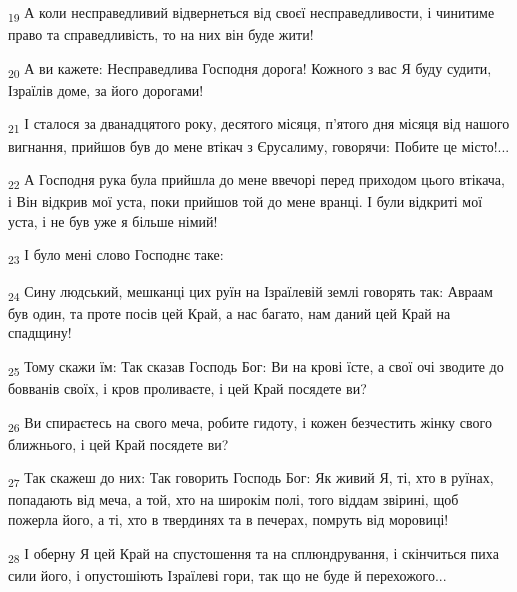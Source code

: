 \begin{tcolorbox}
\textsubscript{19} А коли несправедливий відвернеться від своєї несправедливости, і чинитиме право та справедливість, то на них він буде жити!
\end{tcolorbox}
\begin{tcolorbox}
\textsubscript{20} А ви кажете: Несправедлива Господня дорога! Кожного з вас Я буду судити, Ізраїлів доме, за його дорогами!
\end{tcolorbox}
\begin{tcolorbox}
\textsubscript{21} І сталося за дванадцятого року, десятого місяця, п'ятого дня місяця від нашого вигнання, прийшов був до мене втікач з Єрусалиму, говорячи: Побите це місто!...
\end{tcolorbox}
\begin{tcolorbox}
\textsubscript{22} А Господня рука була прийшла до мене ввечорі перед приходом цього втікача, і Він відкрив мої уста, поки прийшов той до мене вранці. І були відкриті мої уста, і не був уже я більше німий!
\end{tcolorbox}
\begin{tcolorbox}
\textsubscript{23} І було мені слово Господнє таке:
\end{tcolorbox}
\begin{tcolorbox}
\textsubscript{24} Сину людський, мешканці цих руїн на Ізраїлевій землі говорять так: Авраам був один, та проте посів цей Край, а нас багато, нам даний цей Край на спадщину!
\end{tcolorbox}
\begin{tcolorbox}
\textsubscript{25} Тому скажи їм: Так сказав Господь Бог: Ви на крові їсте, а свої очі зводите до бовванів своїх, і кров проливаєте, і цей Край посядете ви?
\end{tcolorbox}
\begin{tcolorbox}
\textsubscript{26} Ви спираєтесь на свого меча, робите гидоту, і кожен безчестить жінку свого ближнього, і цей Край посядете ви?
\end{tcolorbox}
\begin{tcolorbox}
\textsubscript{27} Так скажеш до них: Так говорить Господь Бог: Як живий Я, ті, хто в руїнах, попадають від меча, а той, хто на широкім полі, того віддам звірині, щоб пожерла його, а ті, хто в твердинях та в печерах, помруть від моровиці!
\end{tcolorbox}
\begin{tcolorbox}
\textsubscript{28} І оберну Я цей Край на спустошення та на сплюндрування, і скінчиться пиха сили його, і опустошіють Ізраїлеві гори, так що не буде й перехожого...
\end{tcolorbox}
